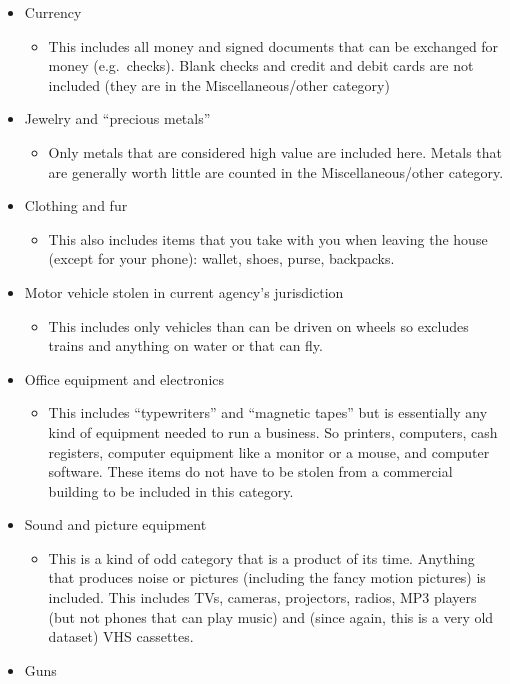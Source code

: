 \documentclass[
  12pt,
  openany]{book}
\providecommand{\tightlist}{%
  \setlength{\itemsep}{0pt}\setlength{\parskip}{0pt}}
\begin{document}
\begin{itemize}
\tightlist
\item
  Currency

  \begin{itemize}
  \tightlist
  \item
    This includes all money and signed documents that can be exchanged for money (e.g.~checks). Blank checks and credit and debit cards are not included (they are in the Miscellaneous/other category)
  \end{itemize}
\item
  Jewelry and ``precious metals''

  \begin{itemize}
  \tightlist
  \item
    Only metals that are considered high value are included here. Metals that are generally worth little are counted in the Miscellaneous/other category.
  \end{itemize}
\item
  Clothing and fur

  \begin{itemize}
  \tightlist
  \item
    This also includes items that you take with you when leaving the house (except for your phone): wallet, shoes, purse, backpacks.
  \end{itemize}
\item
  Motor vehicle stolen in current agency's jurisdiction

  \begin{itemize}
  \tightlist
  \item
    This includes only vehicles than can be driven on wheels so excludes trains and anything on water or that can fly.
  \end{itemize}
\item
  Office equipment and electronics

  \begin{itemize}
  \tightlist
  \item
    This includes ``typewriters'' and ``magnetic tapes'' but is essentially any kind of equipment needed to run a business. So printers, computers, cash registers, computer equipment like a monitor or a mouse, and computer software. These items do not have to be stolen from a commercial building to be included in this category.
  \end{itemize}
\item
  Sound and picture equipment

  \begin{itemize}
  \tightlist
  \item
    This is a kind of odd category that is a product of its time. Anything that produces noise or pictures (including the fancy motion pictures) is included. This includes TVs, cameras, projectors, radios, MP3 players (but not phones that can play music) and (since again, this is a very old dataset) VHS cassettes.
  \end{itemize}
\item
  Guns


\end{itemize}
\end{document}
